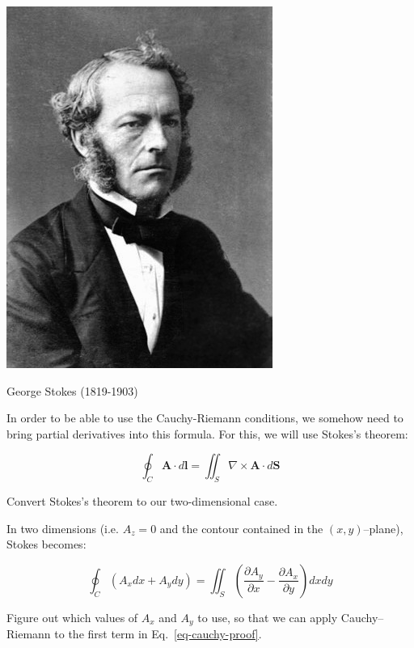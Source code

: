 \begin{marginfigure}[-3cm]
  \includegraphics{complex/figures/stokes}
  \caption{George Stokes (1819-1903)}
\end{marginfigure}

In order to be able to use the Cauchy-Riemann conditions, we somehow need to bring partial derivatives into this formula. For this, we will use Stokes's theorem:

\begin{equation}
\oint_{{{C}}} {\mathbf A} \cdot d {\mathbf l} = \iint_S \nabla \times {\mathbf A} \cdot d {\mathbf S}
\end{equation}

\begin{cue}
Convert Stokes's theorem to our two-dimensional case.
\end{cue}

In two dimensions (i.e. $A_z=0$ and the contour contained in the $(x,y)$--plane), Stokes becomes:

\begin{equation}
\oint_{{C}} \left(A_x dx + A_y dy\right) = \iint_S \left(\frac{\partial
A_y}{\partial x} - \frac{\partial A_x}{\partial y} \right)dx dy
\end{equation} 

\begin{cue}
Figure out which values of $A_x$ and $A_y$ to use, so that we can apply Cauchy--Riemann to the first term in Eq.~\ref{eq-cauchy-proof}.
\end{cue}

